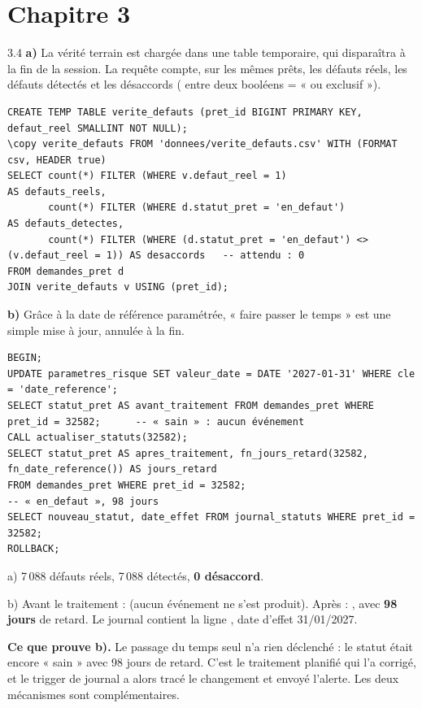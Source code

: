 \section*{Chapitre 3}

\begin{correction}{3.4}
\textbf{a)} La vérité terrain est chargée dans une table temporaire, qui disparaîtra à la fin de la
session. La requête compte, sur les mêmes prêts, les défauts réels, les défauts détectés et les
désaccords (\code{<>} entre deux booléens = « ou exclusif »).
\begin{lstlisting}[style=long]
CREATE TEMP TABLE verite_defauts (pret_id BIGINT PRIMARY KEY, defaut_reel SMALLINT NOT NULL);
\copy verite_defauts FROM 'donnees/verite_defauts.csv' WITH (FORMAT csv, HEADER true)
SELECT count(*) FILTER (WHERE v.defaut_reel = 1)                                   AS defauts_reels,
       count(*) FILTER (WHERE d.statut_pret = 'en_defaut')                         AS defauts_detectes,
       count(*) FILTER (WHERE (d.statut_pret = 'en_defaut') <> (v.defaut_reel = 1)) AS desaccords   -- attendu : 0
FROM demandes_pret d
JOIN verite_defauts v USING (pret_id);
\end{lstlisting}

\textbf{b)} Grâce à la date de référence paramétrée, « faire passer le temps » est une simple mise à
jour, annulée à la fin.
\begin{lstlisting}[style=long]
BEGIN;
UPDATE parametres_risque SET valeur_date = DATE '2027-01-31' WHERE cle = 'date_reference';
SELECT statut_pret AS avant_traitement FROM demandes_pret WHERE pret_id = 32582;      -- « sain » : aucun événement
CALL actualiser_statuts(32582);
SELECT statut_pret AS apres_traitement, fn_jours_retard(32582, fn_date_reference()) AS jours_retard
FROM demandes_pret WHERE pret_id = 32582;                                            -- « en_defaut », 98 jours
SELECT nouveau_statut, date_effet FROM journal_statuts WHERE pret_id = 32582;
ROLLBACK;
\end{lstlisting}

\begin{resultat}
a) 7\,088 défauts réels, 7\,088 détectés, \textbf{0 désaccord}.\par
b) Avant le traitement :  (aucun événement ne s'est produit). Après : , avec
\textbf{98 jours} de retard. Le journal contient la ligne , date d'effet 31/01/2027.
\end{resultat}

\textbf{Ce que prouve b).} Le passage du temps seul n'a rien déclenché : le statut était encore « sain »
avec 98 jours de retard. C'est le traitement planifié qui l'a corrigé, et le trigger de journal a alors
tracé le changement et envoyé l'alerte. Les deux mécanismes sont complémentaires.
\end{correction}

